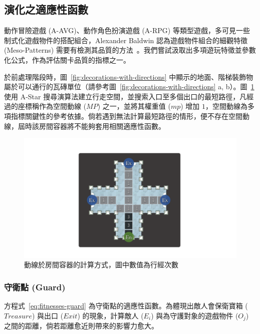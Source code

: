 \subsection{演化之適應性函數}
\label{ssec:method-segments-fitnesses}

動作冒險遊戲 (A-AVG)、動作角色扮演遊戲 (A-RPG) 等類型遊戲，多可見一些制式化遊戲物件的搭配組合，Alexander Baldwin 認為遊戲物件組合的細觀特徵 (Meso-Patterns) 需要有檢測其品質的方法~\cite{baldwin2017mixed}。我們嘗試汲取出多項遊玩特徵並參數化公式，作為評估關卡品質的指標之一。

於前處理階段時，圖~\ref{fig:decorations-with-directions} 中顯示的地面、階梯裝飾物屬於可以通行的瓦磚單位（請參考圖~\ref{fig:decorations-with-directions} a, b）。圖~\ref{fig:fitnesses-mainpath} 使用 A-Star 搜尋演算法建立行走空間，並搜索入口至多個出口的最短路徑，凡經過的座標稱作為空間動線 ($MP$) 之一，並將其權重值 ($mp$) 增加 $1$，空間動線為多項指標關鍵性的參考依據。倘若遇到無法計算最短路徑的情形，便不存在空間動線，屆時該房間容器將不能夠套用相關適應性函數。

\begin{figure}[ht]
  \begin{center}
    \includegraphics[width=1.0\textwidth]{figures/fitnesses-mainpath.pdf}
    \caption{動線於房間容器的計算方式，圖中數值為行經次數}
    \label{fig:fitnesses-mainpath}
  \end{center}
\end{figure}

\subsubsection{守衛點 (Guard)}
\label{sssec:method-segments-fitnesses-guard}

方程式~\ref{eq:fitnesses-guard} 為守衛點的適應性函數。為體現出敵人會保衛寶箱 ($Treasure$) 與出口 ($Exit$) 的現象，計算敵人 ($E_{i}$) 與為守護對象的遊戲物件 ($O_{j}$) 之間的距離，倘若距離愈近則帶來的影響力愈大。

